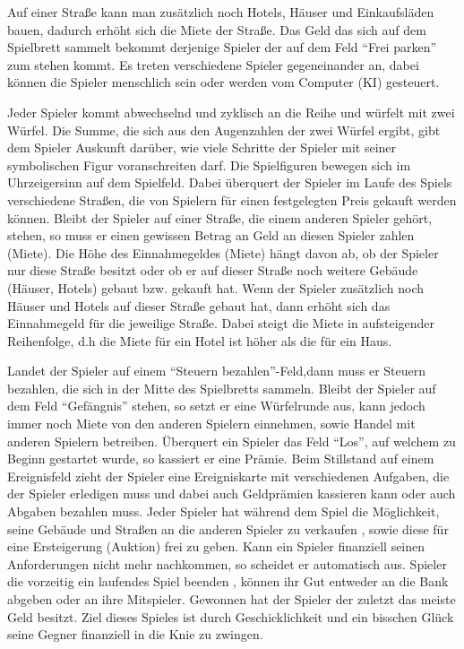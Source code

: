 \documentclass[a4paper,10pt]{article}
\begin{document}
Auf einer Straße kann man zusätzlich noch Hotels, Häuser und Einkaufsläden bauen, dadurch erhöht sich die Miete der Straße. Das Geld das sich auf dem Spielbrett sammelt bekommt derjenige Spieler der auf dem Feld ``Frei parken'' zum stehen kommt.  Es treten verschiedene Spieler gegeneinander an, dabei können die Spieler menschlich sein oder werden vom Computer (KI) gesteuert.

Jeder Spieler kommt abwechselnd und zyklisch an die Reihe und würfelt mit zwei Würfel. Die Summe, die sich aus den Augenzahlen der zwei Würfel ergibt, gibt dem Spieler Auskunft darüber, wie viele Schritte der Spieler mit seiner symbolischen Figur voranschreiten darf. Die Spielfiguren bewegen sich im Uhrzeigersinn auf dem Spielfeld. Dabei überquert der Spieler im Laufe des Spiels verschiedene Straßen, die von Spielern für einen festgelegten Preis gekauft werden können. Bleibt der Spieler auf einer Straße, die einem anderen Spieler gehört, stehen, so muss er einen gewissen Betrag an Geld an diesen Spieler zahlen (Miete). Die Höhe des Einnahmegeldes (Miete) hängt davon ab, ob der Spieler nur diese Straße besitzt oder ob er auf dieser Straße noch weitere Gebäude (Häuser, Hotels) gebaut bzw. gekauft hat. Wenn der Spieler zusätzlich noch Häuser und Hotels auf dieser Straße gebaut hat, dann erhöht sich das Einnahmegeld für die jeweilige Straße. Dabei steigt die Miete in aufsteigender Reihenfolge, d.h die Miete für ein Hotel ist höher als die für ein Haus.
	
Landet der Spieler auf einem ``Steuern bezahlen''-Feld,dann muss er Steuern bezahlen, die sich in der Mitte des Spielbretts sammeln. Bleibt der Spieler auf dem  Feld ``Gefängnis'' stehen, so setzt er eine Würfelrunde aus, kann jedoch immer noch Miete von den anderen Spielern einnehmen, sowie Handel mit anderen Spielern betreiben. Überquert ein Spieler  das Feld ``Los'', auf welchem zu Beginn gestartet wurde, so kassiert er eine Prämie. Beim Stillstand auf einem Ereignisfeld zieht der Spieler eine Ereigniskarte mit verschiedenen Aufgaben, die der Spieler erledigen muss und dabei auch Geldprämien kassieren kann oder auch Abgaben bezahlen muss.  Jeder Spieler hat während dem Spiel die Möglichkeit, seine Gebäude und Straßen an die anderen Spieler zu verkaufen , sowie diese für eine Ersteigerung (Auktion) frei zu geben. Kann ein Spieler finanziell seinen Anforderungen nicht mehr nachkommen, so scheidet er automatisch aus. Spieler die vorzeitig ein laufendes Spiel beenden , können ihr Gut entweder an die Bank abgeben oder an ihre Mitspieler. Gewonnen hat der Spieler der zuletzt das meiste Geld besitzt. Ziel dieses Spieles ist durch Geschicklichkeit und ein bisschen Glück seine Gegner finanziell in die Knie zu zwingen.
\newpage
\end{document}
